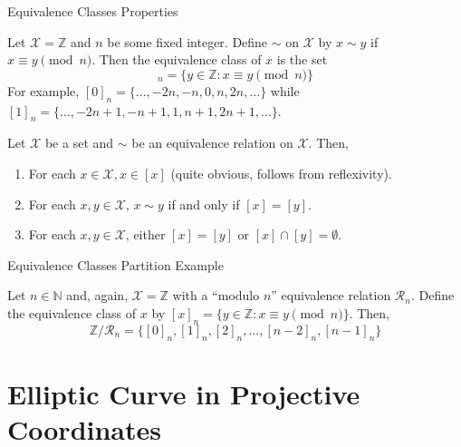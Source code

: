 \documentclass{zkdl-presentation-template}
\begin{document}
    \begin{frame}{Equivalence Classes Properties}
        \begin{example}
            Let $\mathcal{X} = \mathbb{Z}$ and $n$ be some fixed integer. Define $\sim$ on $\mathcal{X}$ by $x \sim y$ if $x \equiv y \pmod{n}$. Then the equivalence class of $x$ is the set
            \begin{equation*}
                [x]_n = \{y \in \mathbb{Z}: x \equiv y \pmod{n}\}
            \end{equation*}
            For example, $[0]_n = \{\ldots,-2n,-n,0,n,2n,\ldots\}$ while $[1]_n = \{\ldots,-2n+1,-n+1,1,n+1,2n+1,\ldots\}$.
        \end{example}

        \pause\begin{lemma}
            Let $\mathcal{X}$ be a set and $\sim$ be an equivalence relation on $\mathcal{X}$. Then,
            \begin{enumerate}
                \item For each $x \in \mathcal{X}, x \in [x]$ (quite obvious, follows from reflexivity).\pause
                \item For each $x,y \in \mathcal{X}$, $x \sim y$ if and only if $[x] = [y]$.\pause
                \item For each $x,y \in \mathcal{X}$, either $[x]=[y]$ or $[x] \cap [y] = \emptyset$.
            \end{enumerate}
        \end{lemma}
    \end{frame}

    \begin{frame}{Equivalence Classes Partition Example}
        \begin{example}
            Let $n \in \mathbb{N}$ and, again, $\mathcal{X} = \mathbb{Z}$ with a ``modulo $n$'' equivalence relation $\mathcal{R}_n$. Define the equivalence class of $x$ by $[x]_n = \{y \in \mathbb{Z}: x \equiv y \pmod{n}\}$. Then,
            \begin{equation*}
                \mathbb{Z}/\mathcal{R}_n = \{[0]_n, [1]_n, [2]_n, \dots, [n-2]_n, [n-1]_n\}
            \end{equation*}
        \end{example}
    \end{frame}

    \section{Elliptic Curve in Projective Coordinates}
\end{document}
